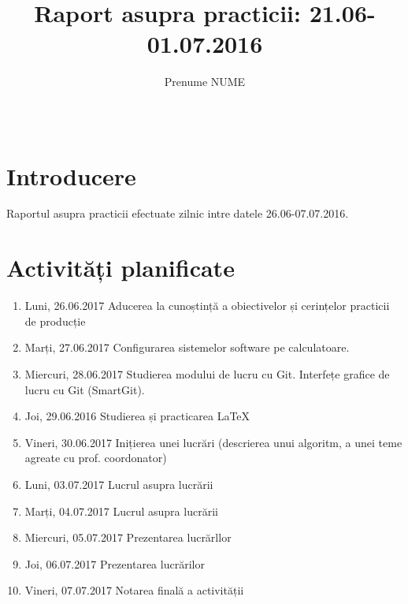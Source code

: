 \documentclass{report}
\title{{\sc Raport asupra practicii: 21.06-01.07.2016}}
\author{Prenume NUME}
\date{\,}
\begin{document}
\maketitle

\tableofcontents

\chapter{Introducere}

Raportul asupra practicii efectuate zilnic intre datele 26.06-07.07.2016.

\chapter{Activități planificate}
\begin{enumerate}
\item  Luni, 26.06.2017 \newline
Aducerea la cunoștință a obiectivelor și cerințelor practicii de producție
\item  Marți, 27.06.2017 \newline
Configurarea sistemelor software pe calculatoare. 
\item  Miercuri, 28.06.2017 \newline
Studierea modului de lucru cu Git. Interfețe grafice de lucru cu Git (SmartGit).
\item  Joi, 29.06.2016 \newline
Studierea și practicarea LaTeX
\item  Vineri, 30.06.2017  \newline
Inițierea unei lucrări (descrierea unui algoritm, a unei teme agreate cu prof. coordonator)
\item  Luni, 03.07.2017  \newline
Lucrul asupra lucrării
\item  Marți, 04.07.2017  \newline
Lucrul asupra lucrării
\item  Miercuri, 05.07.2017  \newline
Prezentarea lucrărllor
\item  Joi, 06.07.2017  \newline
Prezentarea lucrărilor
\item  Vineri, 07.07.2017  \newline
Notarea finală a activității
\end{enumerate}
\end{document}
